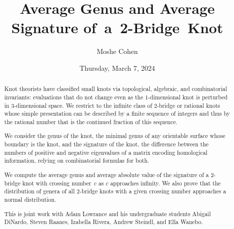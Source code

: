 \documentclass{UAmathtalk}
\author{Moshe Cohen}
\title{Average Genus and Average Signature of~a~2-Bridge~Knot}
\date{Thursday, March 7, 2024}
\begin{document}
\maketitle

\begin{abstract}
Knot theorists have classified small knots via topological, algebraic, and combinatorial invariants:  evaluations that do not change even as the $1$-dimensional knot is perturbed in $3$-dimensional space.  We restrict to the infinite class of $2$-bridge or rational knots whose simple presentation can be described by a finite sequence of integers and thus by the rational number that is the continued fraction of this sequence.

We consider the genus of the knot, the minimal genus of any orientable surface whose boundary is the knot, and the signature of the knot, the difference between the numbers of positive and negative eigenvalues of a matrix encoding homological information, relying on combinatorial formulas for both.

We compute the average genus and average absolute value of the signature of a $2$-bridge knot with crossing number~$c$ as $c$ approaches infinity.  We also prove that the distribution of genera of all $2$-bridge knots with a given crossing number approaches a normal distribution.

This is joint work with Adam Lowrance and his undergraduate students Abigail DiNardo, Steven Raanes, Izabella Rivera, Andrew Steindl, and Ella Wanebo.
\end{abstract}
\end{document}
